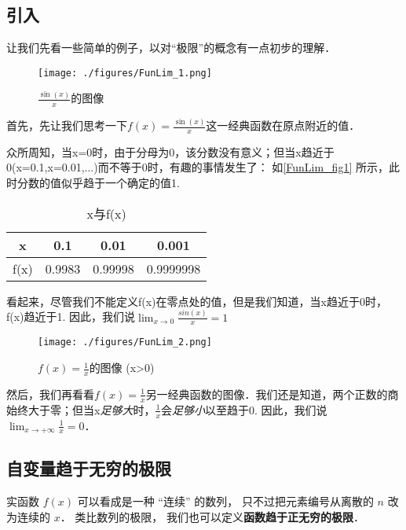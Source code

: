 

\subsection{引入}
让我们先看一些简单的例子，以对“极限”的概念有一点初步的理解．
\begin{example}{}\label{FunLim_ex1}
\begin{figure}[ht]
\centering
\texttt{[image: ./figures/FunLim\_1.png]}
\caption{$\frac{\sin(x)}{x}$的图像} \label{FunLim_fig1}
\end{figure}
首先，先让我们思考一下$f(x)=\frac{\sin(x)}{x}$这一经典函数在原点附近的值．

众所周知，当x=0时，由于分母为0，该分数没有意义；但当x趋近于0(x=0.1,x=0.01,...)而不等于0时，有趣的事情发生了： 如\autoref{FunLim_fig1} 所示，此时分数的值似乎趋于一个确定的值1.

\begin{table}[ht]
\centering
\caption{x与f(x)}\label{FunLim_tab1}
\begin{tabular}{|c|c|c|c|}
\hline
x & 0.1 & 0.01 & 0.001 \\
\hline
f(x) & 0.9983 & 0.99998 & 0.9999998 \\
\hline
\end{tabular}
\end{table}
看起来，尽管我们不能定义f(x)在零点处的值，但是我们知道，当x趋近于0时，f(x)趋近于1. 因此，我们说$\lim_{x\to0}\frac{sin(x)}{x}=1$
\end{example}

\begin{example}{}
\begin{figure}[ht]
\centering
\texttt{[image: ./figures/FunLim\_2.png]}
\caption{$f(x)=\frac{1}{x}$的图像 (x>0)} \label{FunLim_fig2}
\end{figure}
然后，我们再看看$f(x)=\frac{1}{x}$另一经典函数的图像．我们还是知道，两个正数的商始终大于零；但当x\textsl{足够大}时，$\frac{1}{x}$会\textsl{足够小}以至趋于0. 因此，我们说$\lim_{x\to+\infty}\frac{1}{x}=0$．
\end{example}

\subsection{自变量趋于无穷的极限}
实函数 $f(x)$ 可以看成是一种 “连续” 的数列， 只不过把元素编号从离散的 $n$ 改为连续的 $x$． 类比数列的极限， 我们也可以定义\textbf{函数趋于正无穷的极限}．

